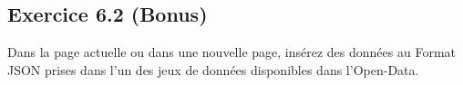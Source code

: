 \documentclass[a4paper,11pt]{article}
\begin{document}
        \begin{figure}
        \end{figure}

        \newpage
        \subsection{Exercice 6.2 (Bonus)}
            \noindent Dans la page actuelle ou dans une nouvelle page, insérez des
            données au Format JSON prises dans l’un des jeux de données disponibles dans l’Open-Data.
\end{document}
